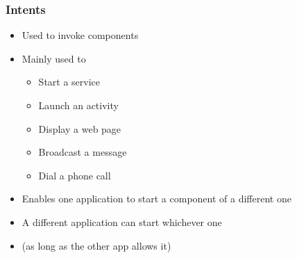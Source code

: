 %
%

\begin{frame}
  \frametitle{Intents}
  
  \begin{itemize}
  \item<1-> Used to invoke components
  
  \item<2->[] Mainly used to 
    \begin{itemize}
    \item<3-> Start a service
    \item<4-> Launch an activity
    \item<5-> Display a web page
    \item<6-> Broadcast a message
    \item<7-> Dial a phone call
    \end{itemize}
    
  \item<8-> Enables one application to start a component of a
    different one

  \item<9-> A different application can start whichever one
  \item<9->[] (as long as the other app allows it)


  \end{itemize}

\end{frame}


